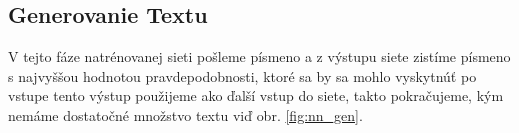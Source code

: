 \subsection{Generovanie Textu}
V tejto fáze natrénovanej sieti pošleme písmeno a z výstupu siete zistíme písmeno s najvyššou hodnotou pravdepodobnosti, ktoré sa by sa mohlo vyskytnúť po vstupe tento výstup použijeme ako ďalší vstup do siete, takto pokračujeme, kým nemáme dostatočné množstvo textu viď obr. \ref{fig:nn_gen}.

\usetikzlibrary{positioning}




	
			
